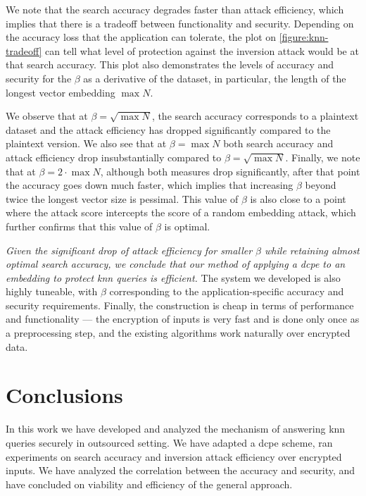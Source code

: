 		

		We note that the search accuracy degrades faster than attack efficiency, which implies that there is a tradeoff between functionality and security.
		Depending on the accuracy loss that the application can tolerate, the plot on \cref{figure:knn-tradeoff} can tell what level of protection against the inversion attack would be at that search accuracy.
		This plot also demonstrates the levels of accuracy and security for the $\beta$ as a derivative of the dataset, in particular, the length of the longest vector embedding $\max N$.

		We observe that at $\beta = \sqrt{\max N}$, the search accuracy corresponds to a plaintext dataset and the attack efficiency has dropped significantly compared to the plaintext version.
		We also see that at $\beta = \max N$ both search accuracy and attack efficiency drop insubstantially compared to $\beta = \sqrt{\max N}$.
		Finally, we note that at $\beta = 2 \cdot \max N$, although both measures drop significantly, after that point the accuracy goes down much faster, which implies that increasing $\beta$ beyond twice the longest vector size is pessimal.
		This value of $\beta$ is also close to a point where the attack \FOne{} score intercepts the \FOne{} score of a random embedding attack, which further confirms that this value of $\beta$ is optimal.

		\emph{Given the significant drop of attack efficiency for smaller $\beta$ while retaining almost optimal search accuracy, we conclude that our method of applying a \acrlong{dcpe} to an embedding to protect \acrshort{knn} queries is efficient.}
		The system we developed is also highly tuneable, with $\beta$ corresponding to the application-specific accuracy and security requirements.
		Finally, the construction is cheap in terms of performance and functionality --- the encryption of inputs is very fast and is done only once as a preprocessing step, and the existing algorithms work naturally over encrypted data.


	\section{Conclusions}

		In this work we have developed and analyzed the mechanism of answering \acrshort{knn} queries securely in outsourced setting.
		We have adapted a \acrshort{dcpe} scheme, ran experiments on search accuracy and inversion attack efficiency over encrypted inputs.
		We have analyzed the correlation between the accuracy and security, and have concluded on viability and efficiency of the general approach.

